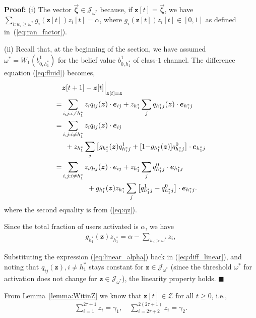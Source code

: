 \documentclass[11pt,twocolumn]{IEEEtran}
\begin{document}
\noindent \textbf{Proof:}
(i) The vector  $\vec{\bm \zeta} \in {\mathcal{J}_{\omega^*}}$ because, if $\bm z[t]=\vec{\bm \zeta}$, we have $\sum_{i: w_i \geq \omega^*} g_i(\bm z[t])z_i[t]=\alpha$, where $g_i(\bm z[t])z_i[t]\in [0,1]$ as defined in~(\ref{eq:ran_factor}).
\vspace{3pt}

(ii) Recall that, at the beginning of the section, we have assumed $\omega^*=W_1(b^1_{0,h^*_1})$ for the belief value $b^1_{0,h^*_1}$ of class-$1$ channel. The difference equation (\ref{eq:fluid}) becomes,
\begin{align}
\nonumber
&\bm z[t+1]-\bm z[t]\Big|_{\bm z[t]=\bm z} \nonumber\\
{=}& \sum_{i, j: i \neq h^*_1} z_i q_{ij}(\bm z) \cdot \bm e_{ij}+  z_{h^*_1} \sum_{j} q_{h^*_1 j}(\bm z) \cdot \bm e_{h^*_1 j} \nonumber \\
{=}& \sum_{i, j: i \neq h^*_1} z _i q_{ij}(\bm z ) \cdot \bm e_{ij}\nonumber\\
&\hspace{5pt}+ z_{h^*_1}  \sum_{j} \big[g_{h^*_1}(\bm z )q^1_{h^*_1 j}+[1{-}g_{h^*_1}(\bm z )]q^0_{h^*_1 j} \big] \cdot \bm e_{h^*_1 j}\nonumber \\
{=}&\sum_{i, j: i \neq h^*_1} z _i q_{ij}(\bm z ) \cdot \bm e_{ij}+  z_{h^*_1}  \sum_{j} q^0_{h^*_1 j}\cdot \bm e_{h^*_1 j}\nonumber\\
&\hspace{0.5in}+ g_{h^*_1}(\bm z) z_{h^*_1}  \sum_{j} \big[ q^1_{h^*_1 j}-q^0_{h^*_1 j} \big] \cdot \bm e_{h^*_1 j}. \label{eq:diff_linear}
\end{align}
where the second equality is from (\ref{eq:qz}).

Since the total fraction of users activated is $\alpha$, we have
\begin{align}
\label{eq:linear_alpha}
g_{h^*_1}(\bm z )z _{{h^*_1}} =\alpha-\sum_{w_i > \omega^*} z_i,
\end{align}

Substituting the expression (\ref{eq:linear_alpha}) back in (\ref{eq:diff_linear}), and noting that $q_{ij}(\bm z), i {\neq} h^*_1$ stays constant for $\bm z {\in} \mathcal{J}_{\omega^*}$ (since the threshold $\omega^*$ for activation does not change for $\bm z \in \mathcal{J}_{\omega^*}$), the linearity property holds. \hfill $\blacksquare$

\vspace{10pt}



From Lemma~\ref{lemma:WitinZ} we know that $\bm z[t] \in \mathcal{Z}$ for all $t \geq 0$, i.e.,
\begin{align}
\sum_{i=1}^{2\tau+1} z_i=\gamma_1, \quad \sum_{i=2\tau+2}^{2(2\tau+1)} z_i=\gamma_2 . \label{eq:beta2}
\end{align}
\end{document}
